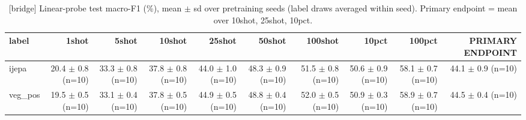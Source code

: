 \begin{table}[t]
\centering
\small
\caption{[bridge] Linear-probe test macro-F1 (\%), mean $\pm$ sd over pretraining seeds (label draws averaged within seed). Primary endpoint = mean over 10shot, 25shot, 10pct.}
\label{tab:main_results_probe}
\begin{tabular}{lrrrrrrrrr}
\toprule
label & 1shot & 5shot & 10shot & 25shot & 50shot & 100shot & 10pct & 100pct & PRIMARY ENDPOINT \\
\midrule
ijepa & 20.4 $\pm$ 0.8 (n=10) & 33.3 $\pm$ 0.8 (n=10) & 37.8 $\pm$ 0.8 (n=10) & 44.0 $\pm$ 1.0 (n=10) & 48.3 $\pm$ 0.9 (n=10) & 51.5 $\pm$ 0.8 (n=10) & 50.6 $\pm$ 0.9 (n=10) & 58.1 $\pm$ 0.7 (n=10) & 44.1 $\pm$ 0.9 (n=10) \\
veg\_pos & 19.5 $\pm$ 0.5 (n=10) & 33.1 $\pm$ 0.4 (n=10) & 37.8 $\pm$ 0.5 (n=10) & 44.9 $\pm$ 0.5 (n=10) & 48.8 $\pm$ 0.4 (n=10) & 52.0 $\pm$ 0.5 (n=10) & 50.9 $\pm$ 0.3 (n=10) & 58.9 $\pm$ 0.7 (n=10) & 44.5 $\pm$ 0.4 (n=10) \\
\bottomrule
\end{tabular}
\end{table}
